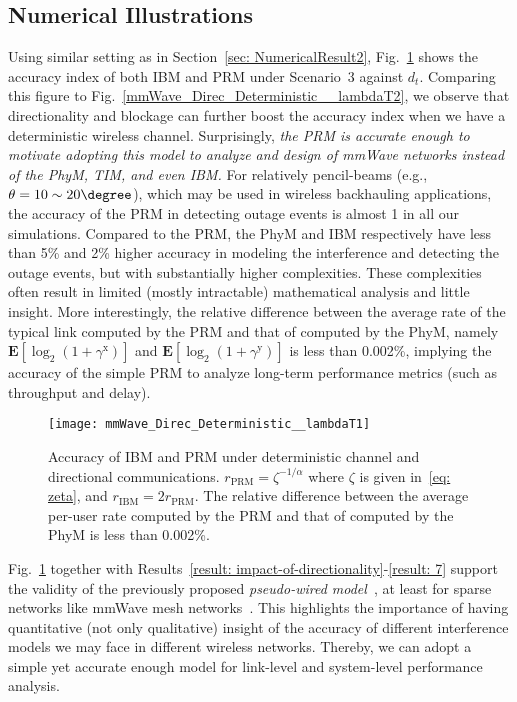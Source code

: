 \documentclass[12pt, draftclsnofoot, onecolumn]{IEEEtran}
\begin{document}
\subsection{Numerical Illustrations}
Using similar setting as in Section~\ref{sec: NumericalResult2}, Fig.~\ref{mmWave_Direc_Deterministic__lambdaT} shows the accuracy index of both IBM and PRM under Scenario~3 against $d_t$. Comparing this figure to Fig.~\ref{mmWave_Direc_Deterministic__lambdaT2}, we observe that directionality and blockage can further boost the accuracy index when we have a deterministic wireless channel. Surprisingly, \emph{the PRM is accurate enough to motivate adopting this model to analyze and design of mmWave networks instead of the PhyM, TIM, and even IBM.}
For relatively pencil-beams (e.g., $\theta=10\sim20 \degree$), which may be used in wireless backhauling applications, the accuracy of the PRM in detecting outage events is almost 1 in all our simulations. Compared to the PRM, the PhyM and IBM respectively have less than 5\% and 2\% higher accuracy in modeling the interference and detecting the outage events, but with substantially higher complexities. These complexities often result in limited (mostly intractable) mathematical analysis and little insight. More interestingly, the relative difference between the average rate of the typical link computed by the PRM and that of computed by the PhyM, namely $\mathbf{E}[\log_2(1+\gamma^{\mathrm{x}})]$ and $\mathbf{E}[\log_2(1+\gamma^{\mathrm{y}})]$ is less than 0.002\%, implying the accuracy of the simple PRM to analyze long-term performance metrics (such as throughput and delay).
\begin{figure}[!t]
  \centering
  \texttt{[image: mmWave\_Direc\_Deterministic\_\_lambdaT1]}

  \caption{Accuracy of IBM and PRM under deterministic channel and directional communications. $r_{\text{PRM}} = \zeta^{-1/\alpha}$ where $\zeta$ is given in~\eqref{eq: zeta}, and $r_{\text{IBM}} = 2 r_{\text{PRM}}$. The relative difference between the average per-user rate computed by the PRM and that of computed by the PhyM is less than 0.002\%.}
  \label{mmWave_Direc_Deterministic__lambdaT}
\vspace{-7mm}
\end{figure}

Fig.~\ref{mmWave_Direc_Deterministic__lambdaT} together with Results~\ref{result: impact-of-directionality}-\ref{result: 7} support the validity of the previously proposed \emph{pseudo-wired model}~\cite{Singh2011Interference}, at least for sparse networks like mmWave mesh networks~\cite{Yaghoubi2016Mitigation}.
This highlights the importance of having quantitative (not only qualitative) insight of the accuracy of different interference models we may face in different wireless networks. Thereby, we can adopt a simple yet accurate enough model for link-level and system-level performance analysis.
\end{document}
